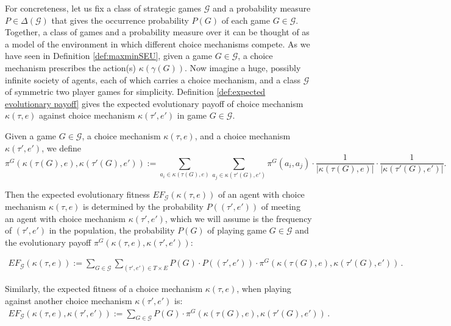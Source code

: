 \documentclass[fleqn,reqno,11pt]{article}
\begin{document}
For concreteness, let us fix a class of strategic games $\mathcal{G}$ and a probability measure
$P \in \Delta(\mathcal{G})$ that gives the occurrence probability $P(G)$ of each game
$G \in \mathcal{G}$. Together, a class of games and a probability measure over it can be
thought of as a model of the environment in which different choice mechanisms compete. As we have seen in Definition \ref{def:maxminSEU}, given a game $G \in \mathcal{G}$, a choice mechanism prescribes the action(s) $\kappa(\gamma(G))$. Now imagine a huge, possibly infinite society of agents, each of which carries a choice mechanism, and a class $\mathcal{G}$ of symmetric two player games for simplicity.
Definition \ref{def:expected evolutionary payoff} gives the expected evolutionary payoff of choice mechanism $\kappa(\tau, e)$ against choice mechanism $\kappa(\tau', e')$ in game $G \in \mathcal{G}$.

\begin{definition} \label{def:expected evolutionary payoff}

Given a game $G \in \mathcal{G}$, a choice mechanism $\kappa(\tau, e)$, and a choice mechanism $\kappa(\tau', e')$, we define $$\pi^G(\kappa(\tau(G), e),\kappa(\tau'(G), e')):= \sum_{a_i \in \kappa(\tau(G), e)} \sum_{a_j \in \kappa(\tau'(G), e')} \pi^G(a_i , a_j) \cdot \frac{1}{|\kappa(\tau(G), e)|} \cdot \frac{1}{|\kappa(\tau'(G), e')|}.$$

\end{definition}

\noindent Then the expected evolutionary fitness $EF_{\mathcal{G}}(\kappa(\tau, e))$ of an agent with
choice mechanism $\kappa(\tau, e)$ is determined by the probability $P((\tau',e'))$ of meeting an agent with
choice mechanism $\kappa(\tau',e')$, which we will assume is the frequency of $(\tau',e')$ in the population, the
probability $P(G)$ of playing game $G \in \mathcal{G}$ and the evolutionary payoff
$\pi^G(\kappa(\tau, e),\kappa(\tau', e'))$:

\begin{align}
\label{eq:EF}
  EF_{\mathcal{G}}(\kappa(\tau, e)) := \sum_{G \in \mathcal{G}} \sum_{(\tau',e') \in T \times E} P(G) \cdot P((\tau',e')) \cdot \pi^G (\kappa(\tau(G), e),\kappa(\tau'(G), e'))\,.
\end{align}

\noindent Similarly, the expected fitness of a choice mechanism $\kappa(\tau, e)$, when playing against another choice mechanism $\kappa(\tau', e')$ is:
\begin{align}
  \label{eq:pairwiseEF}
  EF_{\mathcal{G}}(\kappa(\tau, e),\kappa(\tau', e')) := \sum_{G \in \mathcal{G}}  P(G) \cdot \pi^G(\kappa(\tau(G), e),\kappa(\tau'(G), e'))\,.
\end{align}
\end{document}
